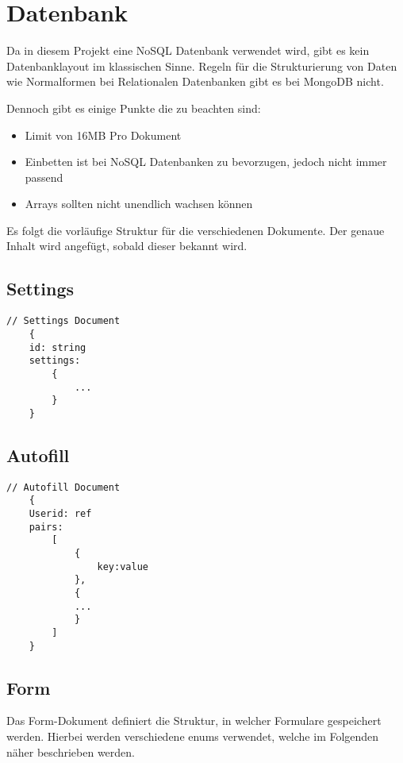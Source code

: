 \chapter{Datenbank}
Da in diesem Projekt eine NoSQL Datenbank verwendet wird, gibt es kein Datenbanklayout im klassischen Sinne.
Regeln für die Strukturierung von Daten wie Normalformen bei Relationalen Datenbanken gibt es bei MongoDB nicht.

Dennoch gibt es einige Punkte die zu beachten sind:
\begin{itemize}
    \item Limit von 16\ac{MB} Pro Dokument
    \item Einbetten ist bei NoSQL Datenbanken zu bevorzugen, jedoch nicht immer passend
    \item Arrays sollten nicht unendlich wachsen können
\end{itemize}

Es folgt die vorläufige Struktur für die verschiedenen Dokumente.
Der genaue Inhalt wird angefügt, sobald dieser bekannt wird.

\section{Settings}

\begin{lstlisting}[label={lst:lstlistingusers}]
    // Settings Document
    {
    id: string
    settings:
        {
            ...
        }
    }

\end{lstlisting}

\section{Autofill}
\begin{lstlisting}[label={lst:lstlistingauto}]
    // Autofill Document
    {
    Userid: ref
    pairs:
        [
            {
                key:value
            },
            {
            ...
            }
        ]
    }

\end{lstlisting}

\section{Form}\label{sec:form}
Das Form-Dokument definiert die Struktur, in welcher Formulare gespeichert werden.
Hierbei werden verschiedene \gls{enum}s verwendet, welche im Folgenden näher beschrieben werden.


